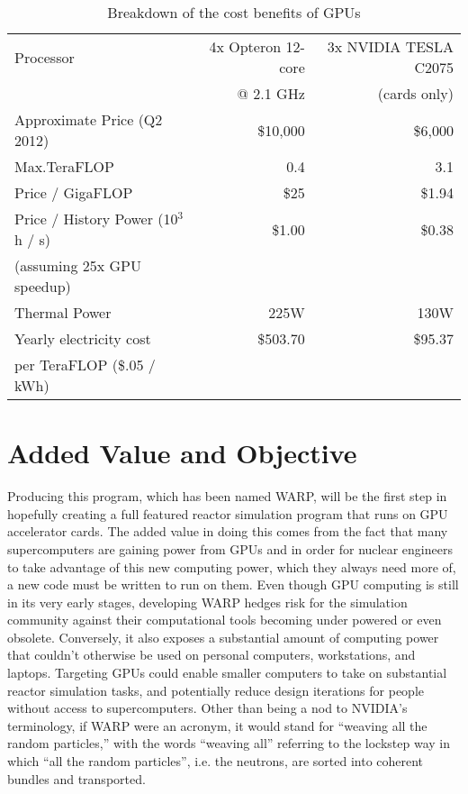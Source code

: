 \begin{table}[h]
\centering
\caption{Breakdown of the cost benefits of GPUs}
\label{gpu_money}
\begin{tabular}{| l | r | r |}
\hline
Processor & 4x Opteron 12-core  & 3x NVIDIA TESLA C2075 \\
  & @ 2.1 GHz &  (cards only)  \\
\hline
\hline
Approximate Price (Q2 2012)& \$10,000 & \$6,000 \\
\hline
Max.TeraFLOP & 0.4 & 3.1 \\
\hline
Price / GigaFLOP & \$25 & \$1.94 \\
\hline
Price / History Power (10$^3$ h / s) & \$1.00 & \$0.38 \\
(assuming 25x GPU speedup) & & \\
\hline
Thermal Power & 225W & 130W \\
\hline
Yearly electricity cost & \$503.70  & \$95.37 \\
per TeraFLOP (\$.05 / kWh)   & & \\
\hline
\end{tabular}
\end{table}

\section{Added Value and Objective}

Producing this program, which has been named WARP, will be the first step in hopefully creating a full featured reactor simulation program that runs on GPU accelerator cards.  The added value in doing this comes from the fact that many supercomputers are gaining power from GPUs and in order for nuclear engineers to take advantage of this new computing power, which they always need more of, a new code must be written to run on them.  Even though GPU computing is still in its very early stages, developing WARP hedges risk for the simulation community against their computational tools becoming under powered or even obsolete.  Conversely, it also exposes a substantial amount of  computing power that couldn't otherwise be used on personal computers, workstations, and laptops.  Targeting GPUs could enable smaller computers to take on substantial reactor simulation tasks, and potentially reduce design iterations for people without access to supercomputers.  Other than being a nod to NVIDIA's terminology, if WARP were an acronym, it would stand for ``weaving all the random particles,'' with the words ``weaving all'' referring to the lockstep way in which ``all the random particles'', i.e. the neutrons, are sorted into coherent bundles and transported.

